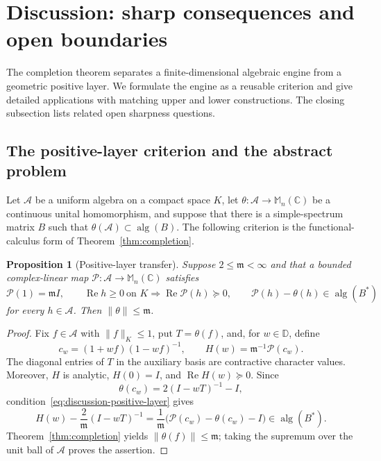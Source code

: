 \documentclass[preprints,article,submit,oneauthor]{Definitions/mdpi}
\newcounter{manuscriptresult}[section]
\theoremstyle{mdpi}
\newtheorem{proposition}[manuscriptresult]{Proposition}
\theoremstyle{definition}
\newcommand{\C}{\mathbb C}
\newcommand{\D}{\mathbb D}
\newcommand{\Mn}{\mathbb M_n(\C)}
\newcommand{\alg}{\operatorname{alg}}
\newcommand{\RePart}{\operatorname{Re}}
\begin{document}
\section{Discussion: sharp consequences and open boundaries}
\label{sec:outlook}

The completion theorem separates a finite-dimensional algebraic
engine from a geometric positive layer.  We formulate the engine as a
reusable criterion and give detailed applications with matching upper
and lower constructions.  The closing subsection lists related open
sharpness questions.

\subsection{The positive-layer criterion and the abstract problem}

Let $\mathcal A$ be a uniform algebra on a compact space $K$, let
$\theta\colon\mathcal A\to\Mn$ be a continuous unital homomorphism,
and suppose that there is a simple-spectrum matrix $B$ such that
$\theta(\mathcal A)\subset\alg(B)$.  The following criterion is the
functional-calculus form of Theorem~\ref{thm:completion}.

\begin{proposition}[Positive-layer transfer]
\label{prop:positive-layer-transfer}
Suppose $2\leq\mathfrak m<\infty$ and that a bounded complex-linear map
$\mathcal P\colon\mathcal A\to\Mn$ satisfies
\begin{equation}
  \mathcal P(1)=\mathfrak m I,
  \qquad
  \RePart h\geq0\ \text{on }K
  \Longrightarrow\RePart\mathcal P(h)\succeq0,
  \qquad
  \mathcal P(h)-\theta(h)\in\alg(B^*)
  \label{eq:discussion-positive-layer}
\end{equation}
for every $h\in\mathcal A$.  Then
$\lVert\theta\rVert\leq\mathfrak m$.
\end{proposition}

\begin{proof}
Fix $f\in\mathcal A$ with $\lVert f\rVert_K\leq1$, put
$T=\theta(f)$, and, for $w\in\D$, define
\[
  c_w=(1+wf)(1-wf)^{-1},
  \qquad H(w)=\mathfrak m^{-1}\mathcal P(c_w).
\]
The diagonal entries of $T$ in the auxiliary basis are contractive
character values.  Moreover, $H$ is analytic, $H(0)=I$, and
$\RePart H(w)\succeq0$.  Since
\[
  \theta(c_w)=2(I-wT)^{-1}-I,
\]
condition~\eqref{eq:discussion-positive-layer} gives
\[
  H(w)-\frac2{\mathfrak m}(I-wT)^{-1}
  =\frac1{\mathfrak m}
   \bigl(\mathcal P(c_w)-\theta(c_w)-I\bigr)
  \in\alg(B^*).
\]
Theorem~\ref{thm:completion} yields
$\lVert\theta(f)\rVert\leq\mathfrak m$; taking the supremum over the
unit ball of $\mathcal A$ proves the assertion.
\end{proof}
\end{document}
